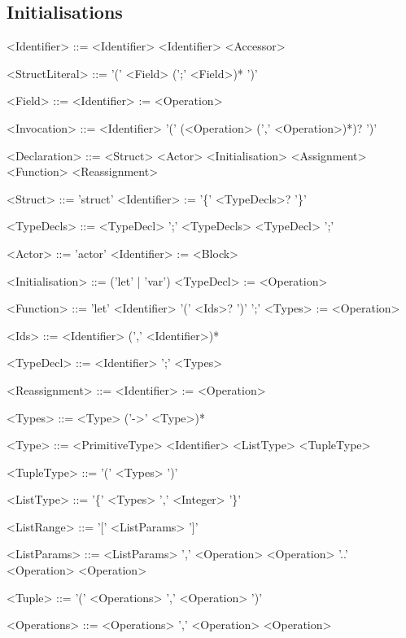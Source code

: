 \subsection{Initialisations}
\begin{grammar}
<Identifier> ::= <Identifier>
 \alt <Identifier> <Accessor>

<StructLiteral> ::= '(' <Field> (';' <Field>)* ')'

<Field> ::= <Identifier> := <Operation> 

<Invocation> ::= <Identifier> '(' (<Operation> (',' <Operation>)*)? ')'

<Declaration> ::= <Struct>
 \alt <Actor>
 \alt <Initialisation>
 \alt <Assignment>
 \alt <Function>
 \alt <Reassignment>

<Struct> ::= 'struct' <Identifier> := '\{' <TypeDecls>? '\}'

<TypeDecls> ::= <TypeDecl> ';' <TypeDecls>
 \alt <TypeDecl> ';'

<Actor> ::= 'actor' <Identifier> := <Block>

<Initialisation> ::= ('let' | 'var') <TypeDecl> := <Operation>

<Function> ::= 'let' <Identifier> '(' <Ids>? ')' ';' <Types> := <Operation>

<Ids> ::= <Identifier> (',' <Identifier>)*

<TypeDecl> ::= <Identifier> ';' <Types>

<Reassignment> ::= <Identifier> := <Operation>

<Types> ::= <Type> ('->' <Type>)*

<Type> ::= <PrimitiveType>
 \alt <Identifier>
 \alt <ListType>
 \alt <TupleType>

<TupleType> ::= '(' <Types> ')'

<ListType> ::= '\{' <Types> ',' <Integer> '\}'

<ListRange> ::= '[' <ListParams> ']'

<ListParams> ::= <ListParams> ',' <Operation>
 \alt <Operation> '..' <Operation>
 \alt <Operation>

<Tuple> ::= '(' <Operations> ',' <Operation> ')'

<Operations> ::= <Operations> ',' <Operation>
 \alt <Operation>
\end{grammar}